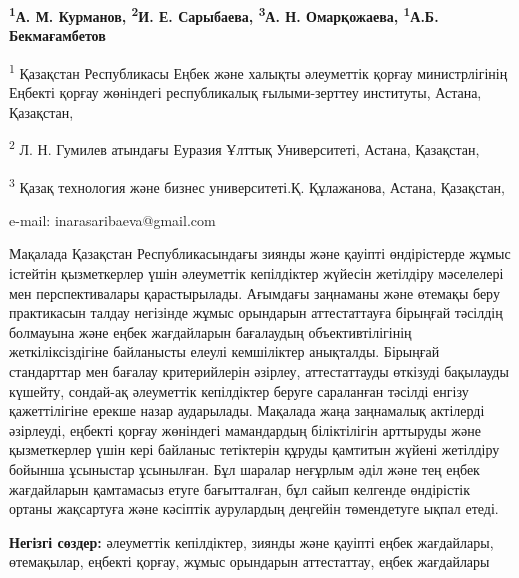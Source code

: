 
\begin{center}
{\bfseries \textsuperscript{1}А. М. Курманов, \textsuperscript{2}И. Е.
Сарыбаева\envelope, \textsuperscript{3}А. Н. Омарқожаева,
\textsuperscript{1}А.Б. Бекмағамбетов}

\textsuperscript{1} Қазақстан Республикасы Еңбек және халықты әлеуметтік
қорғау министрлігінің Еңбекті қорғау жөніндегі республикалық
ғылыми-зерттеу институты, Астана, Қазақстан,

\textsuperscript{2} Л. Н. Гумилев атындағы Еуразия Ұлттық Университеті,
Астана, Қазақстан,

\textsuperscript{3} Қазақ технология және бизнес университеті.Қ.
Құлажанова, Астана, Қазақстан,

e-mail: inarasaribaeva@gmail.com
\end{center}

Мақалада Қазақстан Республикасындағы зиянды және қауіпті өндірістерде
жұмыс істейтін қызметкерлер үшін әлеуметтік кепілдіктер жүйесін
жетілдіру мәселелері мен перспективалары қарастырылады. Ағымдағы
заңнаманы және өтемақы беру практикасын талдау негізінде жұмыс орындарын
аттестаттауға бірыңғай тәсілдің болмауына және еңбек жағдайларын
бағалаудың объективтілігінің жеткіліксіздігіне байланысты елеулі
кемшіліктер анықталды. Бірыңғай стандарттар мен бағалау критерийлерін
әзірлеу, аттестаттауды өткізуді бақылауды күшейту, сондай-ақ әлеуметтік
кепілдіктер беруге сараланған тәсілді енгізу қажеттілігіне ерекше назар
аударылады. Мақалада жаңа заңнамалық актілерді әзірлеуді, еңбекті қорғау
жөніндегі мамандардың біліктілігін арттыруды және қызметкерлер үшін кері
байланыс тетіктерін құруды қамтитын жүйені жетілдіру бойынша ұсыныстар
ұсынылған. Бұл шаралар неғұрлым әділ және тең еңбек жағдайларын
қамтамасыз етуге бағытталған, бұл сайып келгенде өндірістік ортаны
жақсартуға және кәсіптік аурулардың деңгейін төмендетуге ықпал етеді.

{\bfseries Негізгі сөздер:} әлеуметтік кепілдіктер, зиянды және қауіпті
еңбек жағдайлары, өтемақылар, еңбекті қорғау, жұмыс орындарын
аттестаттау, еңбек жағдайлары


